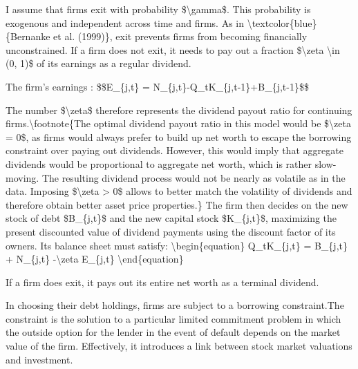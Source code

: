 \documentclass[10pt,math=newtx,citestyle=gb7714-2015,bibstyle=gb7714-2015]{elegantbook}
\begin{document}
	I assume that firms exit with probability \$\textbackslash{}gamma\$. This probability is exogenous and independent across time and firms. As in \textbackslash{}textcolor\{blue\}\{Bernanke et al. (1999)\}, exit prevents firms from becoming financially unconstrained. If a firm does not exit, it needs to pay out a fraction \$\textbackslash{}zeta \textbackslash{}in (0, 1)\$ of its earnings as a regular dividend.
	
	The firm's earnings :
	\$\$E\_\{j,t\} = N\_\{j,t\}-Q\_tK\_\{j,t-1\}+B\_\{j,t-1\}\$\$
	
	The number \$\textbackslash{}zeta\$ therefore represents the dividend payout ratio for continuing firms.\textbackslash{}footnote\{The optimal dividend payout ratio in this model would be \$\textbackslash{}zeta = 0\$, as firms would always prefer to build up net worth to escape the borrowing constraint over paying out dividends. However, this would imply that aggregate dividends would be proportional to aggregate net worth, which is rather slow-moving. The resulting dividend process would not be nearly as volatile as in the data. Imposing \$\textbackslash{}zeta > 0\$ allows to better match the volatility of dividends and therefore obtain better asset price properties.\} The firm then decides on the new stock of debt \$B\_\{j,t\}\$ and the new capital stock \$K\_\{j,t\}\$, maximizing the present discounted value of dividend
	payments using the discount factor of its owners. Its balance sheet must satisfy:
	\textbackslash{}begin\{equation\}
	Q\_tK\_\{j,t\} = B\_\{j,t\} + N\_\{j,t\} -\textbackslash{}zeta E\_\{j,t\}
	\textbackslash{}end\{equation\}
	
	If a firm does exit, it pays out its entire net worth as a terminal dividend.
	
	In choosing their debt holdings, firms are subject to a borrowing constraint.The constraint is the solution to a particular limited commitment problem in which the outside option for the lender in the event of default depends on the market value of the firm. Effectively, it introduces a link between stock market valuations and investment.
	
\end{document}
